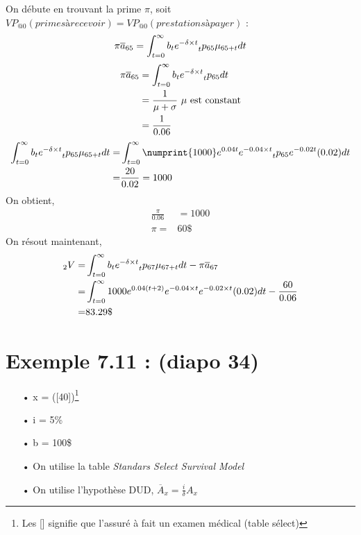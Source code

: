 \documentclass[11pt,french]{report}
\newcommand{\indiceGauche}[2]{{\vphantom{#2}}_{#1}#2}
\begin{document}
On débute en trouvant la prime $\pi$, soit $ VP_{@0}(primes à recevoir) = VP_{@0}(prestations à payer)$ :
\begin{align*}
\pi \overline{a}_{65} &= \int_{t = 0}^{\infty}b_t e^{-\delta \times  t} \indiceGauche{t}{p}_{65} \mu_{65 + t} dt \\
\end{align*}
\begin{align*}
\pi \overline{a}_{65} &= \int_{t = 0}^{\infty}b_t e^{- \delta \times  t} \indiceGauche{t}{p}_{65} dt \\
&= \frac{1}{\mu + \sigma} \text{ $\mu$ est constant}\\
&= \frac{1}{0.06}
\end{align*}
\begin{align*}
\int_{t = 0}^{\infty}b_t e^{-\delta \times  t} \indiceGauche{t}{p}_{65} \mu_{65 + t} dt =& \int_{t = 0}^{\infty}\numprint{1000}e^{0.04t} e^{-0.04 \times  t} \indiceGauche{t}{p}_{65} e^{-0.02t} (0.02)dt\\
=&\frac{20}{0.02} = 1000
\end{align*}
On obtient,
\begin{align*}
\frac{\pi}{0.06} &=1000\\
\pi =& 60\$
\end{align*}
On résout maintenant, 
\begin{align*}
\indiceGauche{2}{V} =& \int_{t = 0}^{\infty}b_t e^{-\delta \times  t} \indiceGauche{t}{p}_{67} \mu_{67 + t} dt - \pi \overline{a}_{67}\\
=&\int_{t = 0}^{\infty}1000e^{0.04 (t+2)} e^{-0.04 \times  t} e^{-0.02\times t}(0.02) dt - \frac{60}{0.06}\\
=& 83.29\$
\end{align*}

\section{Exemple 7.11 : (diapo 34)}
\begin{itemize}
\item[•] x = ([40])\footnote{Les [] signifie que l'assuré à fait un examen médical (table sélect)}
\item[•] i = 5\%
\item[•] b = 100\$
\item[•] On utilise la table \emph{Standars Select Survival Model}
\item[•] On utilise l'hypothèse DUD, $\overline{A}_x = \frac{i}{\delta}A_x$
\end{itemize}
\end{document}

